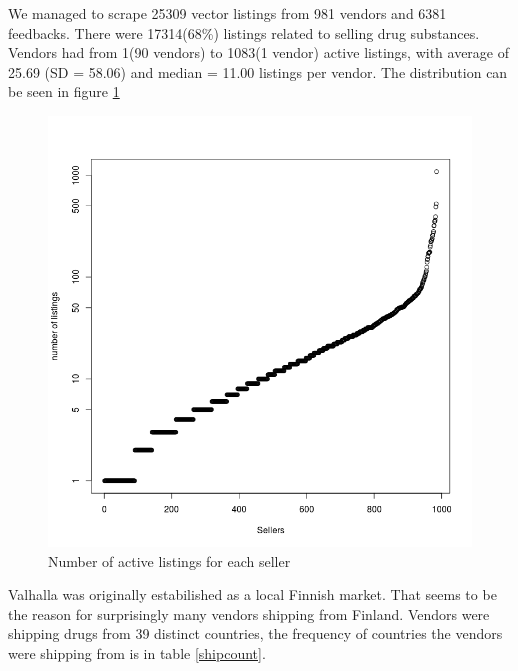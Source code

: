 \documentclass[
  digital, %
  table,   %
  lof,     %
  lot,     %
  oneside
]{fithesis3}
\begin{document}

We managed to scrape 25309 vector listings from 981 vendors and 6381 feedbacks.
There were 17314(68\%) listings related to selling drug substances.
Vendors had from 1(90 vendors) to 1083(1 vendor)
active listings, with average of 25.69 (SD = 58.06)
and median = 11.00 listings per vendor.
The distribution can be seen in figure \ref{listingsxsellers}

\begin{figure}[!htb]
    \centering
    \includegraphics[scale=0.4]{listingsxsellers}
    \caption{Number of active listings for each seller}
    \label{listingsxsellers}
\end{figure}

Valhalla was originally estabilished as a local Finnish market.
That seems to be the reason for surprisingly many vendors shipping from Finland.
Vendors were shipping drugs from 39 distinct countries,
the frequency of countries the vendors were shipping from is in table \ref{shipcount}.
\end{document}
